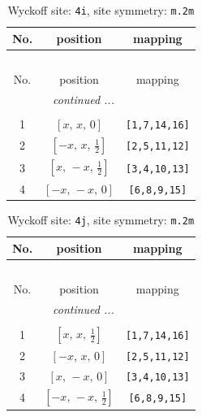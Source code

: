 \documentclass[fleqn,8pt]{jsarticle}
\begin{document}
\renewcommand{\arraystretch}{1.2}
\begin{longtable}{ccc}
\caption{Wyckoff site: {\tt 4i}, site symmetry: {\tt m.2m}}
 \\
 \hline \hline
No. & position & mapping \\ \hline \endfirsthead

\multicolumn{2}{l}{\tablename\ \thetable{}} \\
 \hline \hline
No. & position & mapping \\ \hline \endhead

 \hline \hline
\multicolumn{2}{r}{\footnotesize\it continued ...} \\ \endfoot

 \hline \hline
\multicolumn{2}{r}{} \\ \endlastfoot

1 & $\left[ x,\, x,\, 0 \right]$ & {\tt [1,7,14,16]} \\ \hline
2 & $\left[ - x,\, x,\, \frac{1}{2} \right]$ & {\tt [2,5,11,12]} \\ \hline
3 & $\left[ x,\, - x,\, \frac{1}{2} \right]$ & {\tt [3,4,10,13]} \\ \hline
4 & $\left[ - x,\, - x,\, 0 \right]$ & {\tt [6,8,9,15]} \\
\end{longtable}
\renewcommand{\arraystretch}{1.2}
\begin{longtable}{ccc}
\caption{Wyckoff site: {\tt 4j}, site symmetry: {\tt m.2m}}
 \\
 \hline \hline
No. & position & mapping \\ \hline \endfirsthead

\multicolumn{2}{l}{\tablename\ \thetable{}} \\
 \hline \hline
No. & position & mapping \\ \hline \endhead

 \hline \hline
\multicolumn{2}{r}{\footnotesize\it continued ...} \\ \endfoot

 \hline \hline
\multicolumn{2}{r}{} \\ \endlastfoot

1 & $\left[ x,\, x,\, \frac{1}{2} \right]$ & {\tt [1,7,14,16]} \\ \hline
2 & $\left[ - x,\, x,\, 0 \right]$ & {\tt [2,5,11,12]} \\ \hline
3 & $\left[ x,\, - x,\, 0 \right]$ & {\tt [3,4,10,13]} \\ \hline
4 & $\left[ - x,\, - x,\, \frac{1}{2} \right]$ & {\tt [6,8,9,15]} \\
\end{longtable}
\end{document}
